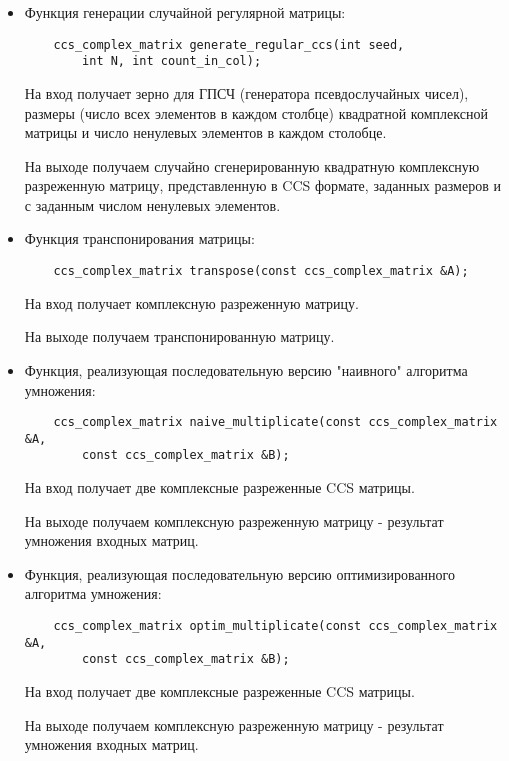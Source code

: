 \documentclass{report}
\begin{document}
\begin{itemize}
\begin{itemize}
		\begin{itemize}
			\item Функция генерации случайной регулярной матрицы:
			\begin{lstlisting}
    ccs_complex_matrix generate_regular_ccs(int seed, 
        int N, int count_in_col);
			\end{lstlisting}
			\par На вход получает зерно для ГПСЧ (генератора псевдослучайных чисел), размеры (число всех элементов в каждом столбце) квадратной комплексной матрицы и число ненулевых элементов в каждом столобце.
			\par На выходе получаем случайно сгенерированную квадратную комплексную разреженную матрицу, представленную в CCS формате, заданных размеров и с заданным числом ненулевых элементов.

			\item Функция транспонирования матрицы:
			\begin{lstlisting}
	ccs_complex_matrix transpose(const ccs_complex_matrix &A);
			\end{lstlisting}
			\par На вход получает комплексную разреженную матрицу.
			\par На выходе получаем транспонированную матрицу.

			\item Функция, реализующая последовательную версию "наивного"{} алгоритма умножения:
			\begin{lstlisting}
	ccs_complex_matrix naive_multiplicate(const ccs_complex_matrix &A, 
        const ccs_complex_matrix &B);
			\end{lstlisting}
			\par На вход получает две комплексные разреженные CCS матрицы. 
			\par На выходе получаем комплексную разреженную матрицу - результат умножения входных матриц.

			\item Функция, реализующая последовательную версию оптимизированного алгоритма умножения:
			\begin{lstlisting}
	ccs_complex_matrix optim_multiplicate(const ccs_complex_matrix &A, 
        const ccs_complex_matrix &B);
			\end{lstlisting}
			\par На вход получает две комплексные разреженные CCS матрицы. 
			\par На выходе получаем комплексную разреженную матрицу - результат умножения входных матриц.


\end{itemize}
\end{itemize}
\end{itemize}
\end{document}
